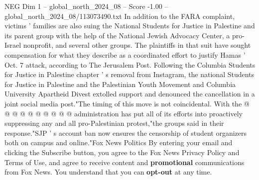 \begin{textsample}{NEG Dim 1 – global\_north\_2024\_08 – Score -1.00 – global\_north\_2024\_08/113073490.txt}
In addition to the FARA complaint, victims ' families are also suing the National Students for Justice in Palestine and its parent group with the help of the National Jewish Advocacy Center, a pro-Israel nonprofit, and several other groups.
The plaintiffs in that suit have sought compensation for what they describe as a coordinated effort to justify Hamas ' Oct. 7 attack, according to The Jerusalem Post.
Following the Columbia Students for Justice in Palestine chapter ' s removal from Instagram, the national Students for Justice in Palestine and the Palestinian Youth Movement and Columbia University Apartheid Divest extolled support and denounced the cancellation in a joint social media post."The timing of this move is not coincidental.
With the @ @ @ @ @ @ @ @ @ @ administration has put all of its efforts into proactively suppressing any and all pro-Palestinian protest,"the groups said in their response."SJP ' s account ban now ensures the censorship of student organizers both on campus and online."Fox News Politics By entering your email and clicking the Subscribe button, you agree to the Fox News Privacy Policy and Terms of Use, and agree to receive content and \textbf{promotional} communications from Fox News.
You understand that you can \textbf{opt-out} at any time.

\end{textsample}
